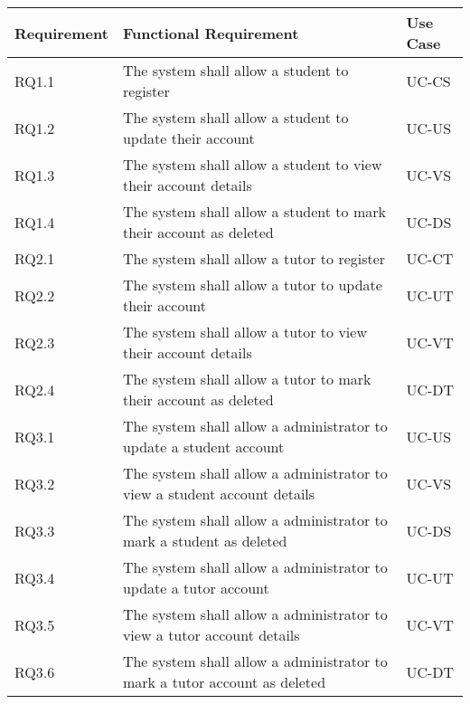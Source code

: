\documentclass[11pt,a4paper]{article}
\begin{document}
		\begin{tabular}{| l | p{10cm}| l |}
			\hline			
			\textbf{Requirement} & \textbf{Functional Requirement} & \textbf{Use Case}
			
			\\ \hline RQ1.1 & The system shall allow a student to register  & UC-CS \\ \hline 
			RQ1.2 & The system shall allow a student to update their account & UC-US \\ \hline  
			RQ1.3 & The system shall allow a student to view their account details  & UC-VS \\ \hline 
			RQ1.4 & The system shall allow a student to mark their account as deleted & UC-DS  \\ \hline 
			RQ2.1 & The system shall allow a tutor to register & UC-CT \\ \hline
			RQ2.2 & The system shall allow a tutor to update their account  & UC-UT \\ \hline
			RQ2.3 & The system shall allow a tutor to view their account details & UC-VT \\ \hline
			RQ2.4 & The system shall allow a tutor to mark their account as deleted & UC-DT \\ \hline  
			
			RQ3.1 & The system shall allow a administrator to update a student account & UC-US \\ \hline  
			RQ3.2 & The system shall allow a administrator to view a student account details  & UC-VS \\ \hline 
			RQ3.3 & The system shall allow a administrator to mark a student as deleted & UC-DS  \\ \hline 
			RQ3.4 & The system shall allow a administrator to update a tutor account  & UC-UT \\ \hline
			RQ3.5 & The system shall allow a administrator to view a tutor account details & UC-VT \\ \hline
			RQ3.6 & The system shall allow a administrator to mark a tutor account as deleted & UC-DT \\ \hline			
			
		\end{tabular}
	
		
		
			
\end{document}

